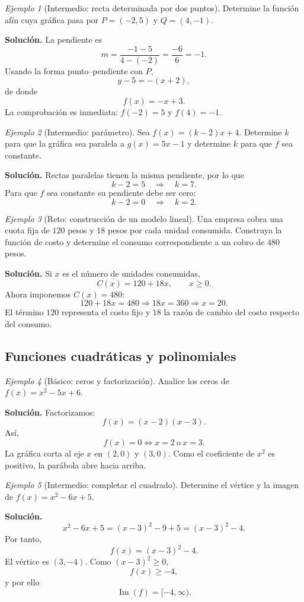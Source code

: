 \documentclass[12pt]{article}
\theoremstyle{remark}
\newtheorem{ejemplo}{Ejemplo}[section]
\newcommand{\Ima}{\operatorname{Im}}
\begin{document}
\begin{ejemplo}[Intermedio: recta determinada por dos puntos]
Determine la función afín cuya gráfica pasa por $P=(-2,5)$ y $Q=(4,-1)$.

\textbf{Solución.} La pendiente es
\[
m=\frac{-1-5}{4-(-2)}=\frac{-6}{6}=-1.
\]
Usando la forma punto--pendiente con $P$,
\[
y-5=-(x+2),
\]
de donde
\[
\boxed{f(x)=-x+3}.
\]
La comprobación es inmediata: $f(-2)=5$ y $f(4)=-1$.
\end{ejemplo}

\begin{ejemplo}[Intermedio: parámetro]
Sea $f(x)=(k-2)x+4$. Determine $k$ para que la gráfica sea paralela a $g(x)=5x-1$ y determine $k$ para que $f$ sea constante.

\textbf{Solución.} Rectas paralelas tienen la misma pendiente, por lo que
\[
k-2=5\quad\Longrightarrow\quad \boxed{k=7}.
\]
Para que $f$ sea constante su pendiente debe ser cero:
\[
k-2=0\quad\Longrightarrow\quad \boxed{k=2}.
\]
\end{ejemplo}

\begin{ejemplo}[Reto: construcción de un modelo lineal]
Una empresa cobra una cuota fija de $120$ pesos y $18$ pesos por cada unidad consumida. Construya la función de costo y determine el consumo correspondiente a un cobro de $480$ pesos.

\textbf{Solución.} Si $x$ es el número de unidades consumidas,
\[
C(x)=120+18x,\qquad x\ge0.
\]
Ahora imponemos $C(x)=480$:
\[
120+18x=480\Longrightarrow 18x=360\Longrightarrow \boxed{x=20}.
\]
El término $120$ representa el costo fijo y $18$ la razón de cambio del costo respecto del consumo.
\end{ejemplo}

\subsection{Funciones cuadráticas y polinomiales}

\begin{ejemplo}[Básico: ceros y factorización]
Analice los ceros de $f(x)=x^2-5x+6$.

\textbf{Solución.} Factorizamos:
\[
f(x)=(x-2)(x-3).
\]
Así,
\[
f(x)=0\Longleftrightarrow x=2\ \text{o}\ x=3.
\]
La gráfica corta al eje $x$ en $(2,0)$ y $(3,0)$. Como el coeficiente de $x^2$ es positivo, la parábola abre hacia arriba.
\end{ejemplo}

\begin{ejemplo}[Intermedio: completar el cuadrado]
Determine el vértice y la imagen de $f(x)=x^2-6x+5$.

\textbf{Solución.}
\[
x^2-6x+5=(x-3)^2-9+5=(x-3)^2-4.
\]
Por tanto,
\[
\boxed{f(x)=(x-3)^2-4}.
\]
El vértice es $(3,-4)$. Como $(x-3)^2\ge0$,
\[
f(x)\ge-4,
\]
y por ello
\[
\boxed{\Ima(f)=[-4,\infty)}.
\]
\end{ejemplo}
\end{document}
